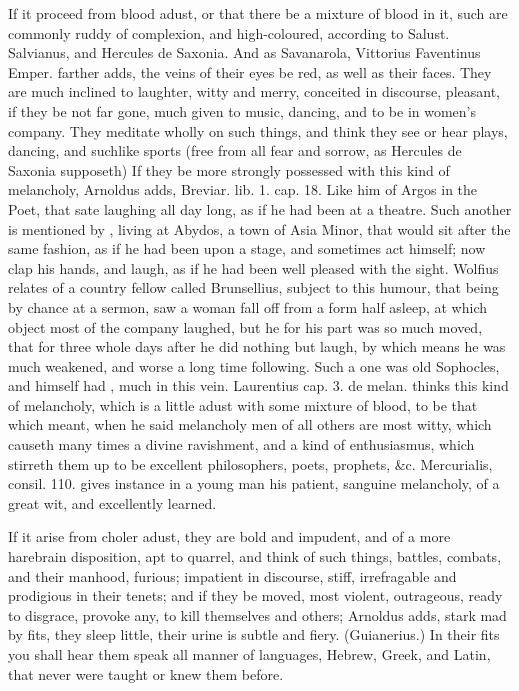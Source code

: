{If it proceed from blood adust, or that there be a mixture of blood in
it, such are commonly ruddy of complexion, and high-coloured,
according to Salust. Salvianus, and Hercules de Saxonia. And as
Savanarola, Vittorius Faventinus Emper. farther adds, the veins
of their eyes be red, as well as their faces. They are much inclined to
laughter, witty and merry, conceited in discourse, pleasant, if they be
not far gone, much given to music, dancing, and to be in women's
company. They meditate wholly on such things, and think they see
or hear plays, dancing, and suchlike sports (free from all fear and
sorrow, as Hercules de Saxonia supposeth) If they be more
strongly possessed with this kind of melancholy, Arnoldus adds,
Breviar. lib. 1. cap. 18. Like him of Argos in the Poet, that sate
laughing all day long, as if he had been at a theatre. Such
another is mentioned by \Aristotle{}, living at Abydos, a town of
Asia Minor, that would sit after the same fashion, as if he had been
upon a stage, and sometimes act himself; now clap his hands, and laugh,
as if he had been well pleased with the sight. Wolfius relates of a
country fellow called Brunsellius, subject to this humour, that
being by chance at a sermon, saw a woman fall off from a form half
asleep, at which object most of the company laughed, but he for his
part was so much moved, that for three whole days after he did nothing
but laugh, by which means he was much weakened, and worse a long time
following. Such a one was old Sophocles, and \Democritus{} himself had
, much in this vein. Laurentius cap. 3. de melan. thinks
this kind of melancholy, which is a little adust with some mixture of
blood, to be that which \Aristotle{} meant, when he said melancholy men of
all others are most witty, which causeth many times a divine
ravishment, and a kind of enthusiasmus, which stirreth them up to be
excellent philosophers, poets, prophets, \&c. Mercurialis, consil. 110.
gives instance in a young man his patient, sanguine melancholy,
of a great wit, and excellently learned.

If it arise from choler adust, they are bold and impudent, and of a
more harebrain disposition, apt to quarrel, and think of such things,
battles, combats, and their manhood, furious; impatient in discourse,
stiff, irrefragable and prodigious in their tenets; and if they be
moved, most violent, outrageous, ready to disgrace, provoke any,
to kill themselves and others; Arnoldus adds, stark mad by fits,
they sleep little, their urine is subtle and fiery. (Guianerius.)
In their fits you shall hear them speak all manner of languages,
Hebrew, Greek, and Latin, that never were taught or knew them before.

}
